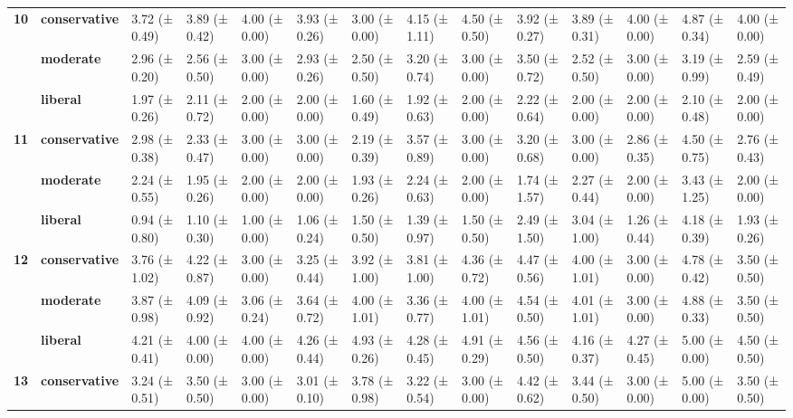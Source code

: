 \begin{longtable}{llllllllllllll}
\cline{1-14}
\multirow[t]{3}{*}{\textbf{10}} & \textbf{conservative} & 3.72 (± 0.49) & 3.89 (± 0.42) & 4.00 (± 0.00) & 3.93 (± 0.26) & 3.00 (± 0.00) & 4.15 (± 1.11) & 4.50 (± 0.50) & 3.92 (± 0.27) & 3.89 (± 0.31) & 4.00 (± 0.00) & 4.87 (± 0.34) & 4.00 (± 0.00) \\
\textbf{} & \textbf{moderate} & 2.96 (± 0.20) & 2.56 (± 0.50) & 3.00 (± 0.00) & 2.93 (± 0.26) & 2.50 (± 0.50) & 3.20 (± 0.74) & 3.00 (± 0.00) & 3.50 (± 0.72) & 2.52 (± 0.50) & 3.00 (± 0.00) & 3.19 (± 0.99) & 2.59 (± 0.49) \\
\textbf{} & \textbf{liberal} & 1.97 (± 0.26) & 2.11 (± 0.72) & 2.00 (± 0.00) & 2.00 (± 0.00) & 1.60 (± 0.49) & 1.92 (± 0.63) & 2.00 (± 0.00) & 2.22 (± 0.64) & 2.00 (± 0.00) & 2.00 (± 0.00) & 2.10 (± 0.48) & 2.00 (± 0.00) \\
\cline{1-14}
\multirow[t]{3}{*}{\textbf{11}} & \textbf{conservative} & 2.98 (± 0.38) & 2.33 (± 0.47) & 3.00 (± 0.00) & 3.00 (± 0.00) & 2.19 (± 0.39) & 3.57 (± 0.89) & 3.00 (± 0.00) & 3.20 (± 0.68) & 3.00 (± 0.00) & 2.86 (± 0.35) & 4.50 (± 0.75) & 2.76 (± 0.43) \\
\textbf{} & \textbf{moderate} & 2.24 (± 0.55) & 1.95 (± 0.26) & 2.00 (± 0.00) & 2.00 (± 0.00) & 1.93 (± 0.26) & 2.24 (± 0.63) & 2.00 (± 0.00) & 1.74 (± 1.57) & 2.27 (± 0.44) & 2.00 (± 0.00) & 3.43 (± 1.25) & 2.00 (± 0.00) \\
\textbf{} & \textbf{liberal} & 0.94 (± 0.80) & 1.10 (± 0.30) & 1.00 (± 0.00) & 1.06 (± 0.24) & 1.50 (± 0.50) & 1.39 (± 0.97) & 1.50 (± 0.50) & 2.49 (± 1.50) & 3.04 (± 1.00) & 1.26 (± 0.44) & 4.18 (± 0.39) & 1.93 (± 0.26) \\
\cline{1-14}
\multirow[t]{3}{*}{\textbf{12}} & \textbf{conservative} & 3.76 (± 1.02) & 4.22 (± 0.87) & 3.00 (± 0.00) & 3.25 (± 0.44) & 3.92 (± 1.00) & 3.81 (± 1.00) & 4.36 (± 0.72) & 4.47 (± 0.56) & 4.00 (± 1.01) & 3.00 (± 0.00) & 4.78 (± 0.42) & 3.50 (± 0.50) \\
\textbf{} & \textbf{moderate} & 3.87 (± 0.98) & 4.09 (± 0.92) & 3.06 (± 0.24) & 3.64 (± 0.72) & 4.00 (± 1.01) & 3.36 (± 0.77) & 4.00 (± 1.01) & 4.54 (± 0.50) & 4.01 (± 1.01) & 3.00 (± 0.00) & 4.88 (± 0.33) & 3.50 (± 0.50) \\
\textbf{} & \textbf{liberal} & 4.21 (± 0.41) & 4.00 (± 0.00) & 4.00 (± 0.00) & 4.26 (± 0.44) & 4.93 (± 0.26) & 4.28 (± 0.45) & 4.91 (± 0.29) & 4.56 (± 0.50) & 4.16 (± 0.37) & 4.27 (± 0.45) & 5.00 (± 0.00) & 4.50 (± 0.50) \\
\cline{1-14}
\multirow[t]{3}{*}{\textbf{13}} & \textbf{conservative} & 3.24 (± 0.51) & 3.50 (± 0.50) & 3.00 (± 0.00) & 3.01 (± 0.10) & 3.78 (± 0.98) & 3.22 (± 0.54) & 3.00 (± 0.00) & 4.42 (± 0.62) & 3.44 (± 0.50) & 3.00 (± 0.00) & 5.00 (± 0.00) & 3.50 (± 0.50) \\

\end{longtable}
